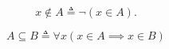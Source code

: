
\begin{frame}{}
  \begin{definition}[$\notin$]
    \[
      x \notin A \triangleq \lnot (x \in A).
    \]
  \end{definition}

  \pause
  \vspace{0.50cm}
  \begin{definition}[$\subseteq$]
    \[
      A \subseteq B \triangleq \forall x (x \in A \implies x \in B)
    \]
  \end{definition}
\end{frame}



% 
% 
